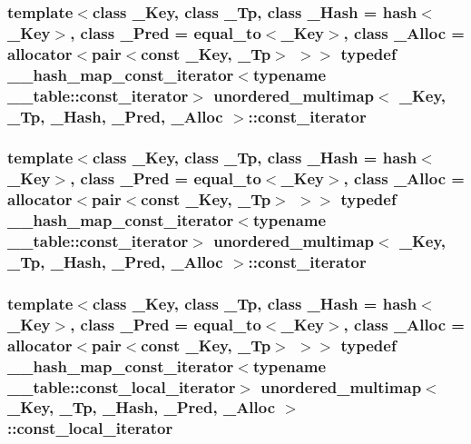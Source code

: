 \subsubsection[{const\+\_\+iterator}]{\setlength{\rightskip}{0pt plus 5cm}template$<$class \+\_\+\+Key, class \+\_\+\+Tp, class \+\_\+\+Hash = hash$<$\+\_\+\+Key$>$, class \+\_\+\+Pred = equal\+\_\+to$<$\+\_\+\+Key$>$, class \+\_\+\+Alloc = allocator$<$pair$<$const \+\_\+\+Key, \+\_\+\+Tp$>$ $>$$>$ typedef {\bf \+\_\+\+\_\+hash\+\_\+map\+\_\+const\+\_\+iterator}$<$typename \+\_\+\+\_\+table\+::const\+\_\+iterator$>$ {\bf unordered\+\_\+multimap}$<$ \+\_\+\+Key, \+\_\+\+Tp, \+\_\+\+Hash, \+\_\+\+Pred, \+\_\+\+Alloc $>$\+::{\bf const\+\_\+iterator}}\label{classunordered__multimap_a3cb373bd19680f9933781c04905fde39}
\hypertarget{classunordered__multimap_a3cb373bd19680f9933781c04905fde39}{}
\subsubsection[{const\+\_\+iterator}]{\setlength{\rightskip}{0pt plus 5cm}template$<$class \+\_\+\+Key, class \+\_\+\+Tp, class \+\_\+\+Hash = hash$<$\+\_\+\+Key$>$, class \+\_\+\+Pred = equal\+\_\+to$<$\+\_\+\+Key$>$, class \+\_\+\+Alloc = allocator$<$pair$<$const \+\_\+\+Key, \+\_\+\+Tp$>$ $>$$>$ typedef {\bf \+\_\+\+\_\+hash\+\_\+map\+\_\+const\+\_\+iterator}$<$typename \+\_\+\+\_\+table\+::const\+\_\+iterator$>$ {\bf unordered\+\_\+multimap}$<$ \+\_\+\+Key, \+\_\+\+Tp, \+\_\+\+Hash, \+\_\+\+Pred, \+\_\+\+Alloc $>$\+::{\bf const\+\_\+iterator}}\label{classunordered__multimap_a3cb373bd19680f9933781c04905fde39}
\hypertarget{classunordered__multimap_a4813834c894681f449b5afe718336482}{}
\subsubsection[{const\+\_\+local\+\_\+iterator}]{\setlength{\rightskip}{0pt plus 5cm}template$<$class \+\_\+\+Key, class \+\_\+\+Tp, class \+\_\+\+Hash = hash$<$\+\_\+\+Key$>$, class \+\_\+\+Pred = equal\+\_\+to$<$\+\_\+\+Key$>$, class \+\_\+\+Alloc = allocator$<$pair$<$const \+\_\+\+Key, \+\_\+\+Tp$>$ $>$$>$ typedef {\bf \+\_\+\+\_\+hash\+\_\+map\+\_\+const\+\_\+iterator}$<$typename \+\_\+\+\_\+table\+::const\+\_\+local\+\_\+iterator$>$ {\bf unordered\+\_\+multimap}$<$ \+\_\+\+Key, \+\_\+\+Tp, \+\_\+\+Hash, \+\_\+\+Pred, \+\_\+\+Alloc $>$\+::{\bf const\+\_\+local\+\_\+iterator}}\label{classunordered__multimap_a4813834c894681f449b5afe718336482}
\hypertarget{classunordered__multimap_a4813834c894681f449b5afe718336482}{}
